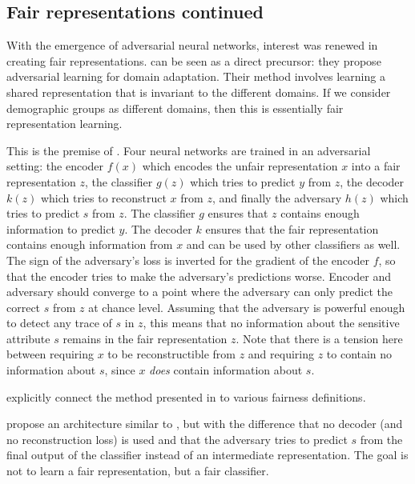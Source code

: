 \subsection{Fair representations continued}
With the emergence of adversarial neural networks, interest was renewed in creating fair representations.
\citet{ganin2016domain} can be seen as a direct precursor:
they propose adversarial learning for domain adaptation.
Their method involves learning a shared representation that is invariant to the different domains.
If we consider demographic groups as different domains, then this is essentially fair representation learning.

This is the premise of \citet{edwards2016censoring}.
Four neural networks are trained in an adversarial setting:
the encoder \(f(x)\) which encodes the unfair representation \(x\) into a fair representation \(z\),
the classifier \(g(z)\) which tries to predict \(y\) from \(z\),
the decoder \(k(z)\) which tries to reconstruct \(x\) from \(z\),
and finally the adversary \(h(z)\) which tries to predict \(s\) from \(z\).
The classifier \(g\) ensures that \(z\) contains enough information to predict \(y\).
The decoder \(k\) ensures that the fair representation contains enough information from \(x\)
and can be used by other classifiers as well.
The sign of the adversary's loss is inverted for the gradient of the encoder \(f\),
so that the encoder tries to make the adversary's predictions worse.
Encoder and adversary should converge to a point
where the adversary can only predict the correct \(s\) from \(z\) at chance level.
Assuming that the adversary is powerful enough to detect any trace of \(s\) in \(z\),
this means that no information about the sensitive attribute \(s\) remains in the fair representation \(z\).
Note that there is a tension here between requiring \(x\) to be reconstructible from \(z\)
and requiring \(z\) to contain no information about \(s\), since \(x\) \emph{does} contain information about \(s\).

\citet{beutel2017data} explicitly connect the method presented in \citet{edwards2016censoring}
to various fairness definitions.

\citet{zhang2018mitigating} propose an architecture similar to \citet{edwards2016censoring},
but with the difference that no decoder (and no reconstruction loss) is used
and that the adversary tries to predict \(s\) from the final output of the classifier
instead of an intermediate representation.
The goal is not to learn a fair representation, but a fair classifier.

